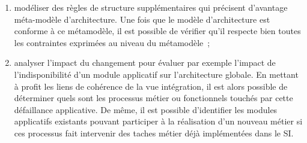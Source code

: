 \begin{enumerate}
    \item modéliser des règles de structure supplémentaires qui précisent d'avantage méta-modèle d'architecture. Une fois
que le modèle d'architecture est conforme à ce métamodèle, il est possible de
vérifier qu'il respecte bien toutes les contraintes exprimées au niveau du
métamodèle~;
    \item analyser l'impact du changement pour évaluer par exemple
l'impact de l'indisponibilité d'un module applicatif sur l'architecture
globale. En mettant à profit les liens de cohérence de la vue intégration, il
est alors possible de déterminer quels sont les processus métier ou
fonctionnels touchés par cette défaillance applicative. De même, il est
possible d'identifier les modules applicatifs existants pouvant participer à la
réalisation d'un nouveau métier si ces processus fait intervenir des taches
métier déjà implémentées dans le SI.
    \end{enumerate}






